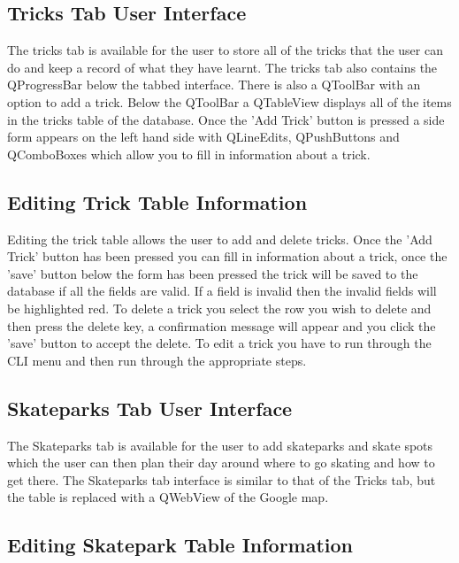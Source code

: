 \subsection{Tricks Tab User Interface}

The tricks tab is available for the user to store all of the tricks that the user can do and keep a record of what they have learnt. The tricks tab also contains the QProgressBar below the tabbed interface. There is also a QToolBar with an option to add a trick. Below the QToolBar a QTableView displays all of the items in the tricks table of the database. Once the 'Add Trick' button is pressed a side form appears on the left hand side with QLineEdits, QPushButtons and QComboBoxes which allow you to fill in information about a trick.

\subsection{Editing Trick Table Information}

Editing the trick table allows the user to add and delete tricks. Once the 'Add Trick' button has been pressed you can fill in information about a trick, once the 'save' button below the form has been pressed the trick will be saved to the database if all the fields are valid. If a field is invalid then the invalid fields will be highlighted red. To delete a trick you select the row you wish to delete and then press the delete key, a confirmation message will appear and you click the 'save' button to accept the delete. To edit a trick you have to run through the CLI menu and then run through the appropriate steps.



\subsection{Skateparks Tab User Interface}

The Skateparks tab is available for the user to add skateparks and skate spots which the user can then plan their day around where to go skating and how to get there. The Skateparks tab interface is similar to that of the Tricks tab, but the table is replaced with a QWebView of the Google map.

\subsection{Editing Skatepark Table Information}

